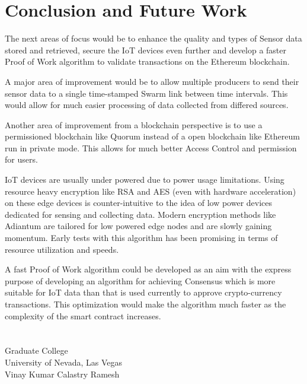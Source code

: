 \documentclass[11pt,openright]{report}
\begin{document}
\chapter{Conclusion and Future Work} \label{chapter:conclusion}
The next areas of focus would be to enhance the quality and types of Sensor data stored and retrieved, secure the IoT devices even further and develop a faster Proof of Work algorithm to validate transactions on the Ethereum blockchain. 

A major area of improvement would be to allow multiple producers to send their sensor data to a single time-stamped Swarm link between time intervals. This would allow for much easier processing of data collected from differed sources.

Another area of improvement from a blockchain perspective is to use a permissioned blockchain like Quorum instead of a open blockchain like Ethereum run in private mode. This allows for much better Access Control and permission for users.

IoT devices are usually under powered due to power usage limitations. Using resource heavy encryption like RSA and AES (even with hardware acceleration) on these edge devices is counter-intuitive to the idea of low power devices dedicated for sensing and collecting data. Modern encryption methods like Adiantum are tailored for low powered edge nodes and are slowly gaining momentum. Early tests with this algorithm has been promising in terms of resource utilization and speeds.

A fast Proof of Work algorithm could be developed as an aim with the express purpose of developing an algorithm for achieving Consensus which is more suitable for IoT data than that is used currently to approve crypto-currency transactions. This optimization would make the algorithm much faster as the complexity of the smart contract increases.





\vita
\chapter{} %
\linespread{1.3} 
\begin{center}
Graduate College\\
University of Nevada, Las Vegas\\[1cm]
Vinay Kumar Calastry Ramesh\\[1cm]
\end{center}
\end{document}

